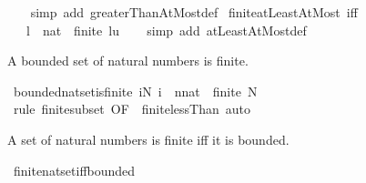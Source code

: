 \begin{isabellebody}
%
\isadelimproof
\ \ %
\endisadelimproof
%
\isatagproof
{}\isamarkupfalse%
\ {\isacharparenleft}{\kern0pt}simp\ add{\isacharcolon}{\kern0pt}\ greaterThanAtMost{\isacharunderscore}{\kern0pt}def{\isacharparenright}{\kern0pt}%
\endisatagproof
{\isafoldproof}%
%
\isadelimproof
\isanewline
%
\endisadelimproof
\isanewline
{}\isamarkupfalse%
\ finite{\isacharunderscore}{\kern0pt}atLeastAtMost\ {\isacharbrackleft}{\kern0pt}iff{\isacharbrackright}{\kern0pt}{\isacharcolon}{\kern0pt}\isanewline
\ \ \ l\ {\isacharcolon}{\kern0pt}{\isacharcolon}{\kern0pt}\ nat\ \ {\isachardoublequoteopen}finite\ {\isacharbraceleft}{\kern0pt}l{\isachardot}{\kern0pt}{\isachardot}{\kern0pt}u{\isacharbraceright}{\kern0pt}{\isachardoublequoteclose}\isanewline
%
\isadelimproof
\ \ %
\endisadelimproof
%
\isatagproof
{}\isamarkupfalse%
\ {\isacharparenleft}{\kern0pt}simp\ add{\isacharcolon}{\kern0pt}\ atLeastAtMost{\isacharunderscore}{\kern0pt}def{\isacharparenright}{\kern0pt}%
\endisatagproof
{\isafoldproof}%
%
\isadelimproof
%
\endisadelimproof
%
\begin{isamarkuptext}%
A bounded set of natural numbers is finite.%
\end{isamarkuptext}\isamarkuptrue%
\isamarkupfalse%
\ bounded{\isacharunderscore}{\kern0pt}nat{\isacharunderscore}{\kern0pt}set{\isacharunderscore}{\kern0pt}is{\isacharunderscore}{\kern0pt}finite{\isacharcolon}{\kern0pt}\ {\isachardoublequoteopen}{\isacharparenleft}{\kern0pt}{\isasymforall}i{\isasymin}N{\isachardot}{\kern0pt}\ i\ {\isacharless}{\kern0pt}\ {\isacharparenleft}{\kern0pt}n{\isacharcolon}{\kern0pt}{\isacharcolon}{\kern0pt}nat{\isacharparenright}{\kern0pt}{\isacharparenright}{\kern0pt}\ {\isasymLongrightarrow}\ finite\ N{\isachardoublequoteclose}\isanewline
%
\isadelimproof
\ \ %
\endisadelimproof
%
\isatagproof
{}\isamarkupfalse%
\ {\isacharparenleft}{\kern0pt}rule\ finite{\isacharunderscore}{\kern0pt}subset\ {\isacharbrackleft}{\kern0pt}OF\ {\isacharunderscore}{\kern0pt}\ finite{\isacharunderscore}{\kern0pt}lessThan{\isacharbrackright}{\kern0pt}{\isacharparenright}{\kern0pt}\ auto%
\endisatagproof
{\isafoldproof}%
%
\isadelimproof
%
\endisadelimproof
%
\begin{isamarkuptext}%
A set of natural numbers is finite iff it is bounded.%
\end{isamarkuptext}\isamarkuptrue%
\isamarkupfalse%
\ finite{\isacharunderscore}{\kern0pt}nat{\isacharunderscore}{\kern0pt}set{\isacharunderscore}{\kern0pt}iff{\isacharunderscore}{\kern0pt}bounded{\isacharcolon}{\kern0pt}\isanewline

\end{isabellebody}
